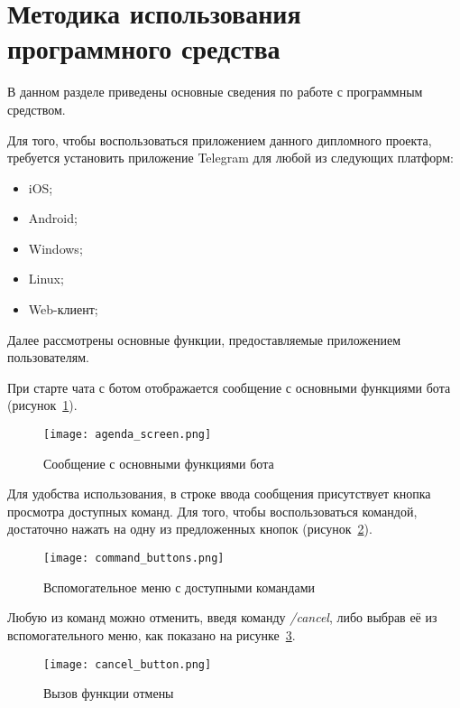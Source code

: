\section{Методика использования программного средства}
\label{sec:manual}

В данном разделе приведены основные сведения по работе с программным средством.

Для того, чтобы воспользоваться приложением данного дипломного проекта, требуется установить приложение Telegram для любой из следующих платформ:

\begin{itemize}
	\item iOS;
	\item Android;
	\item Windows;
	\item Linux;
	\item Web-клиент;
\end{itemize}

Далее рассмотрены основные функции, предоставляемые приложением пользователям.

При старте чата с ботом отображается сообщение с основными функциями бота (рисунок~\ref{fig:manual:agenda_screen}).

\begin{figure}[ht]
\centering
	\texttt{[image: agenda\_screen.png]}
	\caption{Сообщение с основными функциями бота}
	\label{fig:manual:agenda_screen}
\end{figure}

Для удобства использования, в строке ввода сообщения присутствует кнопка просмотра доступных команд. Для того, чтобы воспользоваться командой, достаточно нажать на одну из предложенных кнопок (рисунок~\ref{fig:manual:command_buttons}).

\begin{figure}[ht]
\centering
	\texttt{[image: command\_buttons.png]}
	\caption{Вспомогательное меню с доступными командами}
	\label{fig:manual:command_buttons}
\end{figure}

Любую из команд можно отменить, введя команду \emph{/cancel}, либо выбрав её из вспомогательного меню, как показано на рисунке~\ref{fig:manual:cancel_button}. 

\begin{figure}[ht]
\centering
	\texttt{[image: cancel\_button.png]}
	\caption{Вызов функции отмены}
	\label{fig:manual:cancel_button}
\end{figure}

